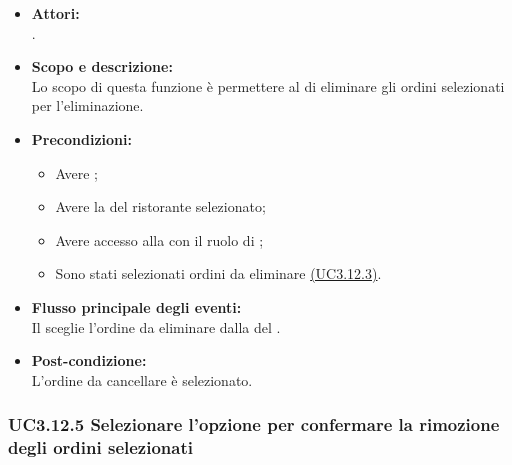 \begin{itemize}
	\item \textbf{Attori:}
	\\.
	\item \textbf{Scopo e descrizione:} 
	\\Lo scopo di questa funzione è permettere al  di eliminare gli ordini selezionati per l'eliminazione.
	\item \textbf{Precondizioni:}
	\begin{itemize}
		\item Avere ;
		\item Avere la  del ristorante selezionato;
		\item Avere accesso alla  con il ruolo di ;
		\item Sono stati selezionati ordini da eliminare \hyperref[UC3.12.3]{(UC3.12.3)}.
	\end{itemize}
	\item \textbf{Flusso principale degli eventi:}
	\\Il {} sceglie l'ordine da eliminare dalla  del .
	\item \textbf{Post-condizione:}
	\\L'ordine da cancellare è selezionato.
\end{itemize}

\subsubsection{UC3.12.5 Selezionare l'opzione per confermare la rimozione degli ordini selezionati} \label{UC3.12.5}

